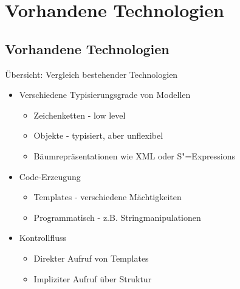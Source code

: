 \documentclass{beamer}
\newcommand{\sexps}{S"=Expressions}
\begin{document}
\section{Vorhandene Technologien}
\subsection{Vorhandene Technologien}

\begin{frame}{Übersicht: Vergleich bestehender Technologien}
  \begin{itemize}
  \item Verschiedene Typisierungsgrade von Modellen
    \begin{itemize}
    \item Zeichenketten - low level
    \item Objekte - typisiert, aber unflexibel
    \item Bäumrepräsentationen wie XML oder \sexps{}
    \end{itemize}
  \item Code-Erzeugung
    \begin{itemize}
    \item Templates - verschiedene Mächtigkeiten
    \item Programmatisch - z.B. Stringmanipulationen
    \end{itemize}
  \item Kontrollfluss
    \begin{itemize}
    \item Direkter Aufruf von Templates
    \item Impliziter Aufruf über Struktur
    \end{itemize}
  \end{itemize}
\end{frame}
\end{document}
